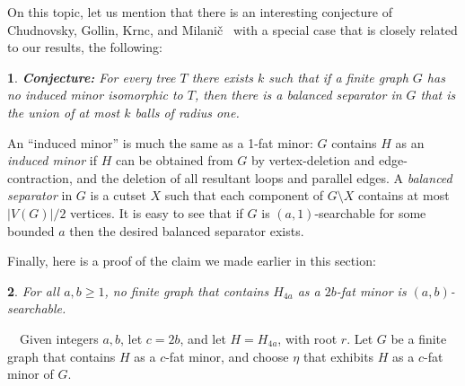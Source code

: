 \documentclass[titlepage,11pt]{article}
\newtheorem{thm}{}[section]
\newcommand{\Proof}{\noindent{\bf Proof.}\ \ }
\begin{document}
	On this topic, let us mention that there is an interesting conjecture of Chudnovsky,  Gollin, Krnc, and Milani\v{c}~\cite{balanced} 
	with a special case that is closely related to our results, the following:
	\begin{thm}\label{mariaconj}
		{\bf Conjecture:} For every tree $T$ there exists $k$ such that if a finite graph $G$ has no induced minor isomorphic to $T$, then there is  a balanced separator in
		$G$ that is the union of at most $k$ balls of radius one.
	\end{thm}
	An ``induced minor'' is much the same as a 1-fat minor: $G$ contains $H$ as an {\em induced minor} if $H$ can be obtained from $G$ by 
	vertex-deletion and edge-contraction, and the deletion of all resultant loops and parallel edges. A {\em balanced separator} in $G$ is a cutset 
	$X$ such that each component of $G\setminus X$ contains at most $|V(G)|/2$ vertices. It is easy to see that if $G$ is $(a,1)$-searchable 
	for some bounded $a$ then the desired balanced separator exists. 
	
	Finally, here is a proof of the claim we made earlier in this section:
	
	\begin{thm}\label{easyhalf}
		For all $a,b\ge 1$, no finite graph that contains $H_{4a}$ as a $2b$-fat minor is $(a,b)$-searchable.
	\end{thm}
	\Proof Given integers $a,b$, let $c=2b$, and let $H=H_{4a}$,
	with root $r$. 
	Let $G$ be a finite graph that contains $H$
	as a $c$-fat minor, and choose $\eta$ that exhibits $H$ as a $c$-fat minor of $G$.
	
\end{document}
